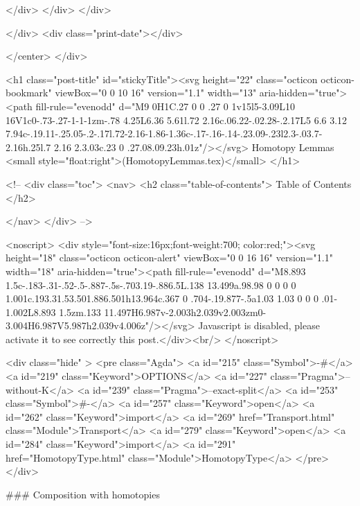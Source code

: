                 </div>
            </div>
          </div>
          
          
        </div>
        <div class="print-date"></div>
        
        
    </center>
  </div>

  

  <h1 class="post-title" id="stickyTitle"><svg height="22" class="octicon octicon-bookmark" viewBox="0 0 10 16" version="1.1" width="13" aria-hidden="true"><path fill-rule="evenodd" d="M9 0H1C.27 0 0 .27 0 1v15l5-3.09L10 16V1c0-.73-.27-1-1-1zm-.78 4.25L6.36 5.61l.72 2.16c.06.22-.02.28-.2.17L5 6.6 3.12 7.94c-.19.11-.25.05-.2-.17l.72-2.16-1.86-1.36c-.17-.16-.14-.23.09-.23l2.3-.03.7-2.16h.25l.7 2.16 2.3.03c.23 0 .27.08.09.23h.01z"/></svg> Homotopy Lemmas <small style="float:right">(HomotopyLemmas.tex)</small>
  </h1>

  <!-- 
  <div class="toc">
    <nav>
    <h2 class="table-of-contents"> Table of Contents </h2>
      

    </nav>
  </div>
   -->

  <noscript>
  <div style="font-size:16px;font-weight:700; color:red;"><svg height="18" class="octicon octicon-alert" viewBox="0 0 16 16" version="1.1" width="18" aria-hidden="true"><path fill-rule="evenodd" d="M8.893 1.5c-.183-.31-.52-.5-.887-.5s-.703.19-.886.5L.138 13.499a.98.98 0 0 0 0 1.001c.193.31.53.501.886.501h13.964c.367 0 .704-.19.877-.5a1.03 1.03 0 0 0 .01-1.002L8.893 1.5zm.133 11.497H6.987v-2.003h2.039v2.003zm0-3.004H6.987V5.987h2.039v4.006z"/></svg> Javascript is disabled, please activate it to see correctly this post.</div><br/>
  </noscript>

  <div class="hide" >
<pre class="Agda">
<a id="215" class="Symbol">{-#</a> <a id="219" class="Keyword">OPTIONS</a> <a id="227" class="Pragma">--without-K</a> <a id="239" class="Pragma">--exact-split</a> <a id="253" class="Symbol">#-}</a>
<a id="257" class="Keyword">open</a> <a id="262" class="Keyword">import</a> <a id="269" href="Transport.html" class="Module">Transport</a>
<a id="279" class="Keyword">open</a> <a id="284" class="Keyword">import</a> <a id="291" href="HomotopyType.html" class="Module">HomotopyType</a>
</pre>
</div>


### Composition with homotopies

